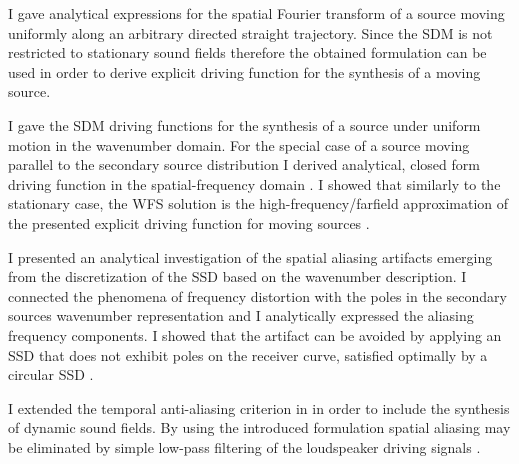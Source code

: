 \begin{thesisgroup}

I gave analytical expressions for the spatial Fourier transform of a source moving uniformly along an arbitrary directed straight trajectory. 
Since the SDM is not restricted to stationary sound fields therefore the obtained formulation can be used in order to derive explicit driving function for the synthesis of a moving source.
\begin{thesis} 
I gave the SDM driving functions for the synthesis of a source under uniform motion in the wavenumber domain.
For the special case of a source moving parallel to the secondary source distribution I derived analytical, closed form driving function in the spatial-frequency domain \cite{Firtha2014:daga, Firtha2014:isma, firtha2015sound}.
I showed that similarly to the stationary case, the WFS solution is the high-frequency/farfield approximation of the presented explicit driving function for moving sources \cite{firtha2015sound}. 
\end{thesis}
\begin{thesis} 
I presented an analytical investigation of the spatial aliasing artifacts emerging from the discretization of the SSD based on the wavenumber description.
I connected the phenomena of frequency distortion with the poles in the secondary sources wavenumber representation and I analytically expressed the aliasing frequency components.
I showed that the artifact can be avoided by applying an SSD that does not exhibit poles on the receiver curve, satisfied optimally by a circular SSD \cite{firtha2016:daga}.
\end{thesis}
\begin{thesis} 
I extended the temporal anti-aliasing criterion in in order to include the synthesis of dynamic sound fields.
By using the introduced formulation spatial aliasing may be eliminated by simple low-pass filtering of the loudspeaker driving signals \cite{Firtha2018_daga_moving_source}.
\end{thesis}
\end{thesisgroup}
